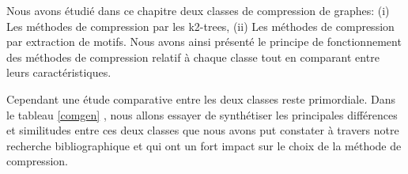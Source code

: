 
Nous avons étudié dans ce chapitre deux classes de compression de graphes: (i)  Les méthodes de compression par les k2-trees, (ii) Les méthodes de compression par extraction de motifs.
Nous avons ainsi présenté le principe de fonctionnement des méthodes de compression relatif à chaque classe tout en comparant entre leurs caractéristiques. 

Cependant une étude comparative entre les deux classes reste primordiale. Dans le tableau \ref{comgen} , nous allons essayer de synthétiser les principales différences et similitudes entre ces deux classes que nous avons put constater à travers notre recherche bibliographique et qui ont un fort impact sur le choix de la méthode de compression.

